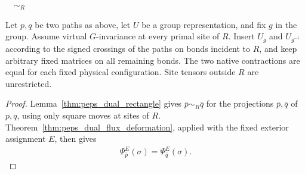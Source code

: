 \begin{tenkzequation}
    \tenkzkernel
    \begin{tenkz}[size=s, metrics=compact, rows={wire,wire,wire,wire,wire,wire,wire}, cols=7, bonds=none]
    \end{tenkz}
    $\quad\sim_R\quad$
    \begin{tenkz}[size=s, metrics=compact, rows={wire,wire,wire,wire,wire,wire,wire}, cols=7, bonds=none]
    \end{tenkz}
\end{tenkzequation}


\begin{lemma}%
    \label{thm:peps_dual_rectangle_exterior}
    \leanok
    Let $p,q$ be two paths as above, let $U$ be a group representation,
    and fix $g$ in the group. Assume virtual $G$-invariance at every
    primal site of $R$. Insert $U_g$ and $U_{g^{-1}}$ according to the
    signed crossings of the paths on bonds incident to $R$, and keep
    arbitrary fixed matrices on all remaining bonds.
    The two native contractions are equal for each fixed physical
    configuration. Site tensors outside $R$ are unrestricted.
\end{lemma}
\begin{proof}\leanok
    Lemma~\ref{thm:peps_dual_rectangle} gives $\bar p\sim_R\bar q$ for the
    projections $\bar p,\bar q$ of $p,q$, using only square moves at sites
    of $R$. Theorem~\ref{thm:peps_dual_flux_deformation}, applied with the
    fixed exterior assignment $E$, then gives
    \begin{align*}
        \Psi_{\bar p}^E(\sigma)=\Psi_{\bar q}^E(\sigma).
    \end{align*}
\end{proof}
